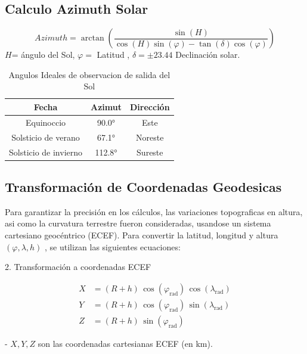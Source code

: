 \documentclass[a4paper,alpha-refs]{eSpectra}
\begin{document}
\subsection{Calculo Azimuth Solar}


\[Azimuth=\arctan \left(
\frac{\sin(H)}{\cos(H)\sin(\varphi) - \tan(\delta)\cos(\varphi)}
\right)\]
\noindent \(H \)= ángulo del Sol, \(\varphi =\) Latitud , \(\delta = \pm 23.44 \) Declinación solar.

\begin{table}[h!]
\centering
\begin{tabular}{|c|c|c|}
\hline
\textbf{Fecha} & \textbf{Azimut}  & \textbf{Dirección} \\ \hline
Equinoccio & 90.0° & Este \\ \hline
Solsticio de verano & 67.1° & Noreste \\ \hline
Solsticio de invierno & 112.8° & Sureste \\ \hline
\end{tabular}
\smallskip
\caption{Angulos Ideales de observacion de salida del Sol}
\label{Cuadro 1}
\end{table}

\vspace{-\baselineskip}  %
\vspace{-1\baselineskip}  %

\subsection{Transformación de Coordenadas Geodesicas}
Para garantizar la precisión en los cálculos, las variaciones topograficas en altura, asi como la curvatura terrestre fueron consideradas, usandose un sistema cartesiano geocéntrico (ECEF). Para convertir la latitud, longitud y altura   \((\varphi, \lambda, h)\) , se utilizan las siguientes ecuaciones:

2. Transformación a coordenadas ECEF

\[
\begin{aligned}
X &= (R + h) \, \cos(\varphi_{\text{rad}}) \, \cos(\lambda_{\text{rad}}) \\
Y &= (R + h) \, \cos(\varphi_{\text{rad}}) \, \sin(\lambda_{\text{rad}}) \\
Z &= (R + h) \, \sin(\varphi_{\text{rad}})
\end{aligned}
\]

- \(X, Y, Z\) son las coordenadas cartesianas ECEF (en km).
\end{document}
